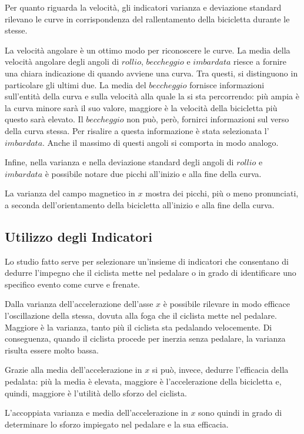 \documentclass[class=article]{standalone}
\begin{document}
	Per quanto riguarda la velocità, gli indicatori varianza e deviazione standard rilevano le curve in corrispondenza del rallentamento della bicicletta durante le stesse.\hfill\break
	
	La velocità angolare è un ottimo modo per riconoscere le curve. La media della velocità angolare degli angoli di \(rollio\), \(beccheggio\) e \(imbardata\) riesce a fornire una chiara indicazione di quando avviene una curva. Tra questi, si distinguono in particolare gli ultimi due. La media del \(beccheggio\) fornisce informazioni sull'entità della curva e sulla velocità alla quale la si sta percorrendo: più ampia è la curva minore sarà il suo valore, maggiore è la velocità della bicicletta più questo sarà elevato. Il \(beccheggio\) non può, però, fornirci informazioni sul verso della curva stessa. Per risalire a questa informazione è stata selezionata l'\(imbardata\). Anche il massimo di questi angoli si comporta in modo analogo.
	
	Infine, nella varianza e nella deviazione standard degli angoli di \(rollio\) e \(imbardata\) è possibile notare due picchi all'inizio e alla fine della curva.\hfill\break
	
	La varianza del campo magnetico in \(x\) mostra dei picchi, più o meno pronunciati, a seconda dell'orientamento della bicicletta all'inizio e alla fine della curva.
	
	\subsection{Utilizzo degli Indicatori}
	Lo studio fatto serve per selezionare un'insieme di indicatori che consentano di dedurre l'impegno che il ciclista mette nel pedalare o in grado di identificare uno specifico evento come curve e frenate.
	
	Dalla varianza dell'accelerazione dell'asse \(x\) è possibile rilevare in modo efficace l'oscillazione della stessa, dovuta alla foga che il ciclista mette nel pedalare. Maggiore è la varianza, tanto più il ciclista sta pedalando velocemente. Di conseguenza, quando il ciclista procede per inerzia senza pedalare, la varianza risulta essere molto bassa.
	
	Grazie alla media dell'accelerazione in \(x\) si può, invece, dedurre l'efficacia della pedalata: più la media è elevata, maggiore è l'accelerazione della bicicletta e, quindi, maggiore è l'utilità dello sforzo del ciclista.
	
	L'accoppiata varianza e media dell'accelerazione in \(x\) sono quindi in grado di determinare lo sforzo impiegato nel pedalare e la sua efficacia.
	
\end{document}
